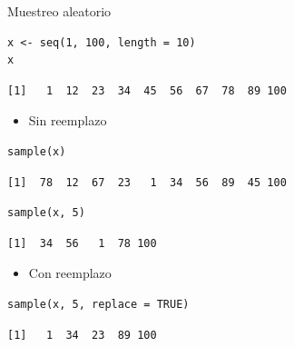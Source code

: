 \documentclass[xcolor={usenames,svgnames,dvipsnames}]{beamer}
\begin{document}
\begin{frame}[fragile,label=sec-3-7]{Muestreo aleatorio}
 \lstset{language=R,label= ,caption= ,numbers=none}
\begin{lstlisting}
x <- seq(1, 100, length = 10)
x
\end{lstlisting}

\begin{verbatim}
[1]   1  12  23  34  45  56  67  78  89 100
\end{verbatim}

\begin{itemize}
\item Sin reemplazo
\end{itemize}
\lstset{language=R,label= ,caption= ,numbers=none}
\begin{lstlisting}
sample(x)
\end{lstlisting}

\begin{verbatim}
[1]  78  12  67  23   1  34  56  89  45 100
\end{verbatim}

\lstset{language=R,label= ,caption= ,numbers=none}
\begin{lstlisting}
sample(x, 5)
\end{lstlisting}

\begin{verbatim}
[1]  34  56   1  78 100
\end{verbatim}

\begin{itemize}
\item Con reemplazo
\end{itemize}
\lstset{language=R,label= ,caption= ,numbers=none}
\begin{lstlisting}
sample(x, 5, replace = TRUE)
\end{lstlisting}

\begin{verbatim}
[1]   1  34  23  89 100
\end{verbatim}
\end{frame}
\end{document}
